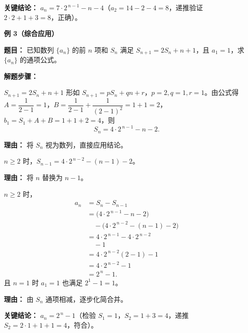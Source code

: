 \begin{examplebox}
	\textbf{\textcolor{CExample}{关键结论：}}
	\textbf{$a_n = 7\cdot 2^{\,n-1} - n - 4$}（$a_2=14-2-4=8$，递推验证 $2\cdot2+1+3=8$，正确）。

	\medskip
	\textbf{\textcolor{CExample}{例 3（综合应用）}}

	\textbf{\textcolor{CExample}{题目：}}
	已知数列 $\{a_n\}$ 的前 $n$ 项和 $S_n$ 满足 $S_{n+1}=2S_n + n + 1$，且 $a_1=1$，求 $\{a_n\}$ 的通项公式。

	\textbf{\textcolor{CExample}{解题步骤：}}
	\begin{description}[style=nextline, leftmargin=2.8em, labelsep=0.5em, itemsep=0.45em]
		\item[\textbf{第一步（对 $S_n$ 套用公式）：}] $S_{n+1}=2S_n + n + 1$ 形如 $S_{n+1}=p S_n+q n+r$，$p=2,q=1,r=1$。由公式得 $A=\dfrac{1}{2-1}=1$，$B=\dfrac{1}{2-1}+\dfrac{1}{(2-1)^2}=1+1=2$，$b_1=S_1+A+B=1+1+2=4$，则
			\[
				S_n = 4\cdot2^{\,n-1} - n - 2.
			\]
			\par\textbf{理由：} 将 $S_n$ 视为数列，直接应用结论。
		\item[\textbf{第二步（求 $S_{n-1}$）：}] $n\ge2$ 时，$S_{n-1} = 4\cdot2^{\,n-2} - (n-1) - 2$。
			\par\textbf{理由：} 将 $n$ 替换为 $n-1$。
		\item[\textbf{第三步（作差得 $a_n$）：}]
			$n\ge2$ 时，
			\[
				\begin{aligned}
					a_n &= S_n - S_{n-1} \\
					&= \bigl(4\cdot2^{\,n-1} - n - 2\bigr) \\
					&\quad - \bigl(4\cdot2^{\,n-2} - (n-1) - 2\bigr) \\
					&= 4\cdot2^{\,n-1} - 4\cdot2^{\,n-2} \\
					&\quad - 1 \\
					&= 4\cdot2^{\,n-2}(2-1) - 1 \\
					&= 4\cdot2^{\,n-2} - 1 \\
					&= 2^{\,n} - 1.
			\end{aligned}
			\]
			且 $n=1$ 时 $a_1=1$ 也满足 $2^1-1=1$。
			\par\textbf{理由：} 由 $S_n$ 通项相减，逐步化简合并。
	\end{description}

	\textbf{\textcolor{CExample}{关键结论：}}
	\textbf{$a_n = 2^{\,n} - 1$}（检验 $S_1=1$，$S_2=1+3=4$，递推 $S_2=2\cdot1+1+1=4$，符合）。
\end{examplebox}
